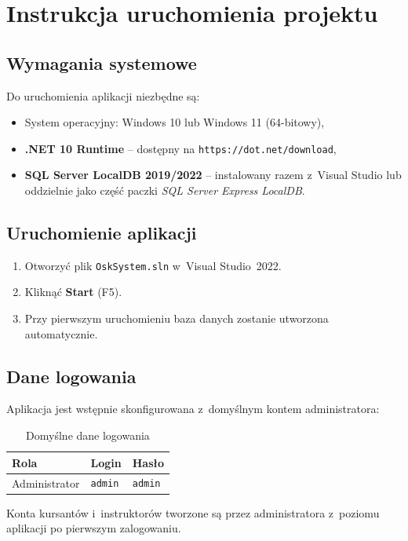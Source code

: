 \chapter{Instrukcja uruchomienia projektu}
\label{ch:instrukcja}

\section{Wymagania systemowe}

Do uruchomienia aplikacji niezb\k{e}dne s\k{a}:
\begin{itemize}
  \item System operacyjny: Windows 10 lub Windows 11 (64-bitowy),
  \item \textbf{.NET 10 Runtime} -- dost\k{e}pny na \texttt{https://dot.net/download},
  \item \textbf{SQL Server LocalDB 2019/2022} -- instalowany razem z~Visual Studio
        lub oddzielnie jako cz\k{e}\'{s}\'{c} paczki \emph{SQL Server Express LocalDB}.
\end{itemize}

\section{Uruchomienie aplikacji}

\begin{enumerate}
  \item Otworzy\'{c} plik \texttt{OskSystem.sln} w~Visual Studio~2022.
  \item Klikn\k{a}\'{c} \textbf{Start} (F5).
  \item Przy pierwszym uruchomieniu baza danych zostanie utworzona automatycznie.
\end{enumerate}

\section{Dane logowania}

Aplikacja jest wst\k{e}pnie skonfigurowana z~domy\'{s}lnym kontem administratora:

\begin{table}[H]
\centering
\caption{Domy\'{s}lne dane logowania}
\label{tab:logowanie}
\begin{tabular}{|l|l|l|}
\hline
\textbf{Rola} & \textbf{Login} & \textbf{Has\l{}o} \\
\hline
Administrator & \texttt{admin} & \texttt{admin} \\
\hline
\end{tabular}
\end{table}

Konta kursant\'{o}w i~instruktor\'{o}w tworzone s\k{a} przez administratora
z~poziomu aplikacji po pierwszym zalogowaniu.
